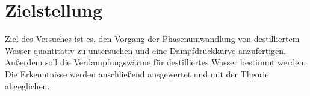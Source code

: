 \section{Zielstellung}
\label{sec:Zielstellung}

Ziel des Versuches ist es, den Vorgang der Phasenumwandlung von destilliertem Wasser quantitativ zu untersuchen und eine Dampfdruckkurve
anzufertigen. Außerdem soll die Verdampfungswärme für destilliertes Wasser bestimmt werden.
Die Erkenntnisse werden anschließend ausgewertet und mit der Theorie abgeglichen.